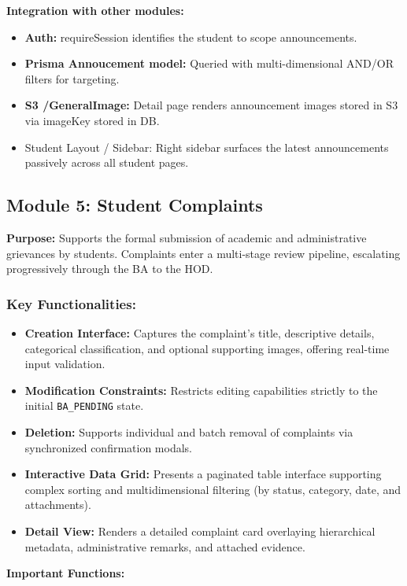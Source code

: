 \textbf{Integration with other modules:}
\begin{itemize}
    \item \textbf{Auth:} requireSession identifies the student to scope announcements.
    \item \textbf{Prisma Annoucement model:} Queried with multi-dimensional AND/OR filters for targeting.
    \item \textbf{S3 /GeneralImage:} Detail page renders announcement images stored in S3 via imageKey stored in DB.
    \item Student Layout / Sidebar: Right sidebar surfaces the latest announcements passively across all student pages.
\end{itemize}

\subsection{Module 5: Student Complaints}
\textbf{Purpose:}
Supports the formal submission of academic and administrative grievances by students. Complaints enter a multi-stage review pipeline, escalating progressively through the BA to the HOD.

\subsubsection{Key Functionalities:}
\begin{itemize}
    \item \textbf{Creation Interface:} Captures the complaint's title, descriptive details, categorical classification, and optional supporting images, offering real-time input validation.
    \item \textbf{Modification Constraints:} Restricts editing capabilities strictly to the initial \texttt{BA\_PENDING} state.
    \item \textbf{Deletion:} Supports individual and batch removal of complaints via synchronized confirmation modals.
    \item \textbf{Interactive Data Grid:} Presents a paginated table interface supporting complex sorting and multidimensional filtering (by status, category, date, and attachments).
    \item \textbf{Detail View:} Renders a detailed complaint card overlaying hierarchical metadata, administrative remarks, and attached evidence.
\end{itemize}

\textbf{Important Functions:}

